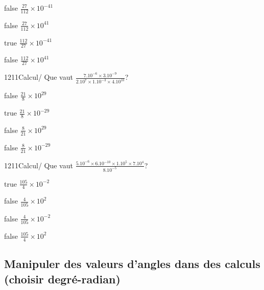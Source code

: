 \documentclass[11pt]{article}
\begin{document}
            \begin{reponses}
                \item[false] $\frac{27}{112}\times 10^{-41}$
                \item[false] $\frac{27}{112}\times 10^{41}$
                \item[true] $\frac{112}{27}\times 10^{-41}$
                \item[false] $\frac{112}{27}\times 10^{41}$
            \end{reponses}
            
            \begin{question}{1211}{Calcul}{}{/}
                Que vaut $\frac{7.10^{-6}\times 3.10^{-9}}{2.10^{7}\times 1.10^{-3}\times 4.10^{10}}$?
            \end{question}
            
            \begin{reponses}
                \item[false] $\frac{21}{8}\times 10^{29}$
                \item[true] $\frac{21}{8}\times 10^{-29}$
                \item[false] $\frac{8}{21}\times 10^{29}$
                \item[false] $\frac{8}{21}\times 10^{-29}$
            \end{reponses}
            
            \begin{question}{1211}{Calcul}{}{/}
                Que vaut $\frac{5.10^{-6}\times 6.10^{-10}\times 1.10^{5}\times 7.10^{4}}{8.10^{-5}}$?
            \end{question}
            
            \begin{reponses}
                \item[true] $\frac{105}{4}\times 10^{-2}$
                \item[false] $\frac{4}{105}\times 10^{2}$
                \item[false] $\frac{4}{105}\times 10^{-2}$
                \item[false] $\frac{105}{4}\times 10^{2}$
            \end{reponses}

            
            
            
            

        \subsection{Manipuler des valeurs d'angles dans des calculs (choisir degré-radian)}
\end{document}
